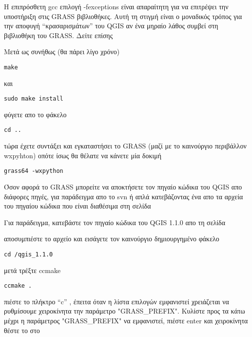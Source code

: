 Η επιπρόσθετη gcc επιλογή -fexceptions είναι απαραίτητη για να επιτρέψει την υποστήριξη στις GRASS βιβλιοθήκες. Αυτή τη στιγμή είναι ο μοναδικός τρόπος για την αποφυγή “κρασαρισμάτων” του QGIS αν ένα μηραίο λάθος συμβεί στη βιβλιοθήκη του GRASS. Δείτε επίσης 

Μετά ως συνήθως (θα πάρει λίγο χρόνο)

\begin{verbatim}
make
\end{verbatim}

και

\begin{verbatim}
sudo make install
\end{verbatim}

φύγετε απο το φάκελο

\begin{verbatim}
cd ..
\end{verbatim}

τώρα έχετε συντάξει και εγκαταστήσει το GRASS (μαζί με το καινούργιο περιβάλλον wxpyhton) οπότε ίσως θα θέλατε να κάνετε μία δοκιμή 

\begin{verbatim}
grass64 -wxpython
\end{verbatim}

Όσον αφορά το GRASS μπορείτε να αποκτήσετε τον πηγαίο κώδικα του QGIS απο διάφορες πηγές, για παράδειγμα απο το svn ή απλά κατεβάζοντας ένα απο τα αρχεία του πηγαίου κώδικα που είναι διαθέσιμα στη σελίδα 

Για παράδειγμα, κατεβάστε τον πηγαίο κώδικα του QGIS 1.1.0 απο τη σελίδα 

αποσυμπιέστε το αρχείο και εισάγετε τον καινούργιο δημιουργημένο φάκελο

\begin{verbatim}
cd /qgis_1.1.0
\end{verbatim}

μετά τρέξτε ccmake

\begin{verbatim}
ccmake .
\end{verbatim}

πιέστε το πλήκτρο  “c” , έπειτα όταν η λίστα επιλογών εμφανιστεί χρειάζεται να ρυθμίσουμε χειροκίνητα την παράμετρο  "GRASS\_PREFIX". Κυλίστε προς τα κάτω μέχρι η παράμετρος "GRASS\_PREFIX" να εμφανιστεί, 
πιέστε enter και χειροκίνητα θέστε το στο

